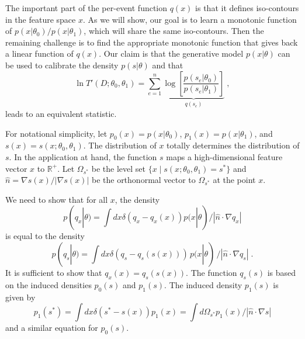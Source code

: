 \documentclass[aoas,preprint]{imsart}
\newcommand{\sstar}{s^*}
\newcommand{\sfunc}{s}
\numberwithin{equation}{section}
\theoremstyle{plain}
\begin{document}
The important part of the per-event function $q(x)$ is that it defines iso-contours in the feature space $x$. As we will show, our goal is to learn a monotonic function of $p(x|\theta_0)/p(x|\theta_1)$, which will share the same iso-contours. Then the remaining challenge is to find the appropriate monotonic function that gives back a linear function of $q(x)$. Our claim is that the generative model $p(x|\theta)$ can be used to calibrate the density $p(s|\theta)$ and that
\begin{equation}\label{eq:enveloping}
\ln T'(D; \theta_0, \theta_1) = \sum_{e=1}^n \underbrace{\log \left[ \frac {p(s_e | \theta_0) }{ p(s_e | \theta_1) } \right]}_{q(s_e)} \;,
\end{equation}
leads to an equivalent statistic.

For notational simplicity, let $p_0(x) = p(x|\theta_0)$, $p_1(x) = p(x|\theta_1)$, and $\sfunc(x)=s(x; \theta_0, \theta_1)$.
The distribution of $x$ totally determines the distribution of $s$. 
In the application at hand, the function $s$ maps a high-dimensional feature vector $x$ to $\mathbb{R}^+$.
Let $\Omega_{\sstar}$ be the level set $\{x \mid s(x; \theta_0, \theta_1) = \sstar \}$ and \mbox{$\hat{n}=\nabla s(x) / |\nabla s(x)|$} be the orthonormal vector to $\Omega_{\sstar}$ at the point $x$.

We need to show that for all $x$, the density
\begin{equation}
p(q_x|\theta) = \int dx \delta(q_x-q_x(x)) p(x|\theta)  / | \hat{n} \cdot \nabla q_x  | 
\end{equation}
is equal to the density
\begin{equation}
p(q_s|\theta) = \int dx \delta(q_s-q_s(s(x))) \, p(x|\theta) \, / | \hat{n} \cdot \nabla q_s  | \; .
\end{equation}
It is sufficient to show that $q_x(x) = q_s(s(x))$.
The function $q_s(s)$ is based on the induced densities $p_0(s)$ and $p_1(s)$.  The induced density $p_1(s)$ is given by 
\begin{equation}
p_1(\sstar) = \int dx \delta(\sstar-s(x)) p_1(x) = \int d\Omega_{\sstar} p_1(x)  / | \hat{n} \cdot \nabla s  |
\end{equation}
and a similar equation for $p_0(s)$. 
\end{document}
